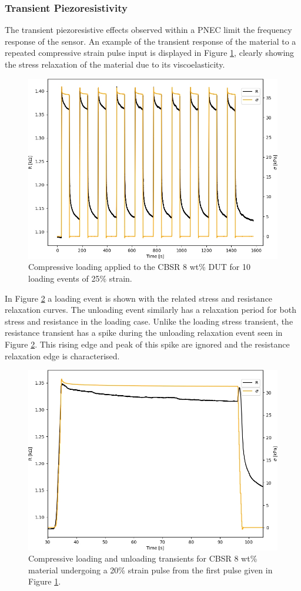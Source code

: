 \subsubsection{Transient Piezoresistivity}\label{sec:Transient Piezoresistivity2}
The transient piezoresistive effects observed within a PNEC limit the frequency response of the sensor. An example of the transient response of the material to a repeated compressive strain pulse input is displayed in Figure \ref{fig:stress_seq}, clearly showing the stress relaxation of the material due to its viscoelasticity. 
\begin{figure}[H]
    \centering
    \includegraphics[width=0.7\linewidth]{Figures/CBSR 8 wt 25p strain - 1D test stress seq.jpg}
    \caption{Compressive loading applied to the CBSR 8 wt\% DUT for 10 loading events of 25\% strain.}
    \label{fig:stress_seq}
\end{figure}
In Figure \ref{fig:load_relax_eg} a loading event is shown with the related stress and resistance relaxation curves. The unloading event similarly has a relaxation period for both stress and resistance in the loading case. Unlike the loading stress transient, the resistance transient has a spike during the unloading relaxation event seen in Figure \ref{fig:load_relax_eg}. This rising edge and peak of this spike are ignored and the resistance relaxation edge is characterised.  
\begin{figure}[H]
    \centering
    \includegraphics[width=0.7\linewidth]{Figures/CBSR 8 wt 25p strain - 1D stress load unload.jpg}
    \caption{Compressive loading and unloading transients for CBSR 8 wt\% material undergoing a 20\% strain pulse from the first pulse given in Figure \ref{fig:stress_seq}.}
    \label{fig:load_relax_eg}
\end{figure}
